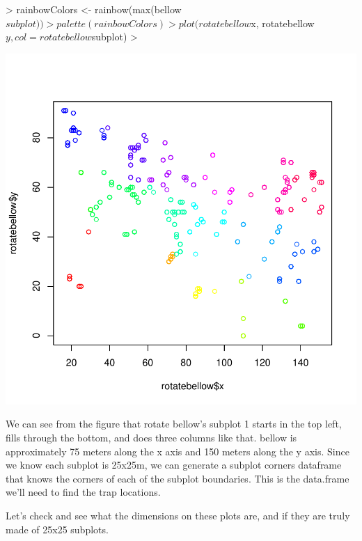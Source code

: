 \documentclass{report}
\begin{document}
\begin{Schunk}
\begin{Sinput}
> rainbowColors <- rainbow(max(bellow$subplot))
> palette(rainbowColors)
> plot(rotatebellow$x, rotatebellow$y, col=rotatebellow$subplot)
> 
\end{Sinput}
\end{Schunk}
\includegraphics{disperseRmanual-014}

We can see from the figure that rotate bellow's subplot 1 starts in the top left, fills through the bottom, and does three columns like that. bellow is approximately 75 meters along the x axis and 150 meters along the y axis. Since we know each subplot is 25x25m, we can generate a subplot corners dataframe that knows the corners of each of the subplot boundaries. This is the data.frame we'll need to find the trap locations.

Let's check and see what the dimensions on these plots are, and if they are truly made of 25x25 subplots.
\end{document}
